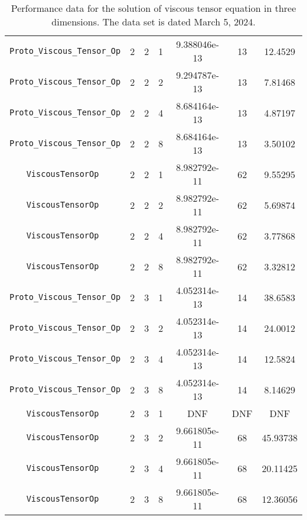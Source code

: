 \documentclass{article}
\begin{document}
\begin{small}
\begin{table}
\begin{center}
\begin{tabular}{|c|c|c|c|c|c||c|}
\hline
 {\tt Proto\_Viscous\_Tensor\_Op}      & 2 & 2 & 1   & 9.388046e-13   & 13      & 12.4529    \\
 {\tt Proto\_Viscous\_Tensor\_Op}      & 2 & 2 & 2   & 9.294787e-13   & 13      & 7.81468    \\
 {\tt Proto\_Viscous\_Tensor\_Op}      & 2 & 2 & 4   & 8.684164e-13   & 13      & 4.87197    \\
 {\tt Proto\_Viscous\_Tensor\_Op}      & 2 & 2 & 8   & 8.684164e-13   & 13      & 3.50102    \\
\hline                                                                          
 {\tt ViscousTensorOp   }              & 2 & 2 & 1   & 8.982792e-11   & 62      & 9.55295    \\
 {\tt ViscousTensorOp   }              & 2 & 2 & 2   & 8.982792e-11   & 62      & 5.69874    \\
 {\tt ViscousTensorOp   }              & 2 & 2 & 4   & 8.982792e-11   & 62      & 3.77868    \\
 {\tt ViscousTensorOp   }              & 2 & 2 & 8   & 8.982792e-11   & 62      & 3.32812    \\
\hline
 {\tt Proto\_Viscous\_Tensor\_Op}      & 2 & 3 & 1   & 4.052314e-13   & 14      & 38.6583    \\
 {\tt Proto\_Viscous\_Tensor\_Op}      & 2 & 3 & 2   & 4.052314e-13   & 14      & 24.0012    \\
 {\tt Proto\_Viscous\_Tensor\_Op}      & 2 & 3 & 4   & 4.052314e-13   & 14      & 12.5824    \\
 {\tt Proto\_Viscous\_Tensor\_Op}      & 2 & 3 & 8   & 4.052314e-13   & 14      & 8.14629    \\
\hline                                                                           
 {\tt ViscousTensorOp   }              & 2 & 3 & 1   & DNF   &    DNF   &  DNF   \\
 {\tt ViscousTensorOp   }              & 2 & 3 & 2   & 9.661805e-11   &  68     &  45.93738   \\
 {\tt ViscousTensorOp   }              & 2 & 3 & 4   & 9.661805e-11   &  68     &  20.11425   \\
 {\tt ViscousTensorOp   }              & 2 & 3 & 8   & 9.661805e-11   &  68     &  12.36056   \\
 \hline
\end{tabular}
\end{center}
\label{tab::8}
\caption
    {
      Performance data for the solution of viscous tensor
      equation in three dimensions.
      The data set is dated March 5, 2024.
    }
\end{table}
\end{small}


\end{document}

